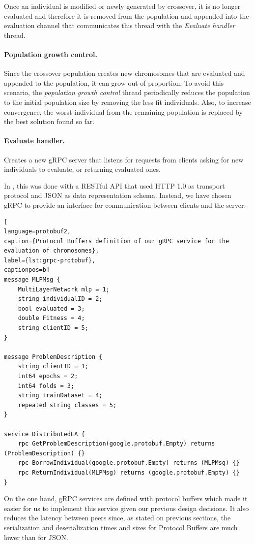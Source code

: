 Once an individual is modified or newly generated by crossover, it is no longer evaluated and therefore it is removed from the population and appended into the evaluation channel that communicates this thread with the \textit{Evaluate handler} thread.

\paragraph*{Population growth control.} Since the crossover population creates new chromosomes that are evaluated and appended to the population, it can grow out of proportion. To avoid this scenario, the \textit{population growth control} thread periodically reduces the population to the initial population size by removing the less fit individuals. Also, to increase convergence, the worst individual from the remaining population is replaced by the best solution found so far.
	
\paragraph*{Evaluate handler.} Creates a new gRPC server that listens for requests from clients asking for new individuals to evaluate, or returning evaluated ones. 

In \cite{paper-pool-jj}, this was done with a RESTful API that used HTTP 1.0 as transport protocol and JSON as data representation schema. Instead, we have chosen gRPC \cite{grpc} to provide an interface for communication between clients and the server.

\begin{lstlisting}[
language=protobuf2,
caption={Protocol Buffers definition of our gRPC service for the evaluation of chromosomes},
label={lst:grpc-protobuf},
captionpos=b]
message MLPMsg {
    MultiLayerNetwork mlp = 1;
    string individualID = 2;
    bool evaluated = 3;
    double Fitness = 4;
    string clientID = 5;
}

message ProblemDescription {
    string clientID = 1;
    int64 epochs = 2;
    int64 folds = 3;
    string trainDataset = 4;
    repeated string classes = 5;
}

service DistributedEA {
    rpc GetProblemDescription(google.protobuf.Empty) returns (ProblemDescription) {}
    rpc BorrowIndividual(google.protobuf.Empty) returns (MLPMsg) {}
    rpc ReturnIndividual(MLPMsg) returns (google.protobuf.Empty) {}
}
\end{lstlisting}

On the one hand, gRPC services are defined with protocol buffers which made it easier for us to implement this service given our previous design decisions. It also reduces the latency between peers since, as stated on previous sections, the serialization and deserialization times and sizes for Protocol Buffers are much lower than for JSON.

